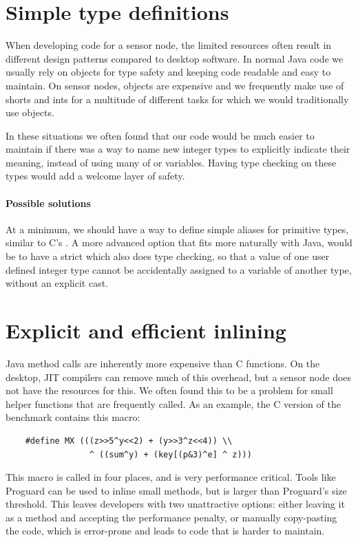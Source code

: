\section{Simple type definitions}
\label{sec-typedef}
When developing code for a sensor node, the limited resources often result in different design patterns compared to desktop software. In normal Java code we usually rely on objects for type safety and keeping code readable and easy to maintain. On sensor nodes, objects are expensive and we frequently make use of shorts and ints for a multitude of different tasks for which we would traditionally use objects.

In these situations we often found that our code would be much easier to maintain if there was a way to name new integer types to explicitly indicate their meaning, instead of using many of  or  variables. Having type checking on these types would add a welcome layer of safety.

\paragraph{Possible solutions}
At a minimum, we should have a way to define simple aliases for primitive types, similar to C's . A more advanced option that fits more naturally with Java, would be to have a strict  which also does type checking, so that a value of one user defined integer type cannot be accidentally assigned to a variable of another type, without an explicit cast.




\section{Explicit and efficient inlining}
\label{sec-inlining}
Java method calls are inherently more expensive than C functions. On the desktop, JIT compilers can remove much of this overhead, but a sensor node does not have the resources for this. We often found this to be a problem for small helper functions that are frequently called. As an example, the C version of the  benchmark contains this macro: 

\begin{verbatim}
    #define MX (((z>>5^y<<2) + (y>>3^z<<4)) \\
                 ^ ((sum^y) + (key[(p&3)^e] ^ z)))
\end{verbatim}

This macro is called in four places, and is very performance critical. Tools like Proguard \cite{proguard} can be used to inline small methods, but  is larger than Proguard's size threshold. This leaves developers with two unattractive options: either leaving it as a method and accepting the performance penalty, or manually copy-pasting the code, which is error-prone and leads to code that is harder to maintain.

